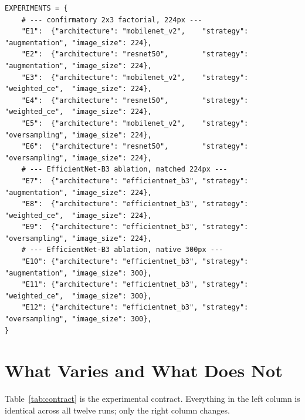 \begin{lstlisting}[caption={The experiment registry, \texttt{src/ham10000/constants.py}.},
                   label={lst:registry}]
EXPERIMENTS = {
    # --- confirmatory 2x3 factorial, 224px ---
    "E1":  {"architecture": "mobilenet_v2",    "strategy": "augmentation", "image_size": 224},
    "E2":  {"architecture": "resnet50",        "strategy": "augmentation", "image_size": 224},
    "E3":  {"architecture": "mobilenet_v2",    "strategy": "weighted_ce",  "image_size": 224},
    "E4":  {"architecture": "resnet50",        "strategy": "weighted_ce",  "image_size": 224},
    "E5":  {"architecture": "mobilenet_v2",    "strategy": "oversampling", "image_size": 224},
    "E6":  {"architecture": "resnet50",        "strategy": "oversampling", "image_size": 224},
    # --- EfficientNet-B3 ablation, matched 224px ---
    "E7":  {"architecture": "efficientnet_b3", "strategy": "augmentation", "image_size": 224},
    "E8":  {"architecture": "efficientnet_b3", "strategy": "weighted_ce",  "image_size": 224},
    "E9":  {"architecture": "efficientnet_b3", "strategy": "oversampling", "image_size": 224},
    # --- EfficientNet-B3 ablation, native 300px ---
    "E10": {"architecture": "efficientnet_b3", "strategy": "augmentation", "image_size": 300},
    "E11": {"architecture": "efficientnet_b3", "strategy": "weighted_ce",  "image_size": 300},
    "E12": {"architecture": "efficientnet_b3", "strategy": "oversampling", "image_size": 300},
}
\end{lstlisting}

\section{What Varies and What Does Not}
\label{sec:method-contract}

Table~\ref{tab:contract} is the experimental contract. Everything in the left column is
identical across all twelve runs; only the right column changes.

